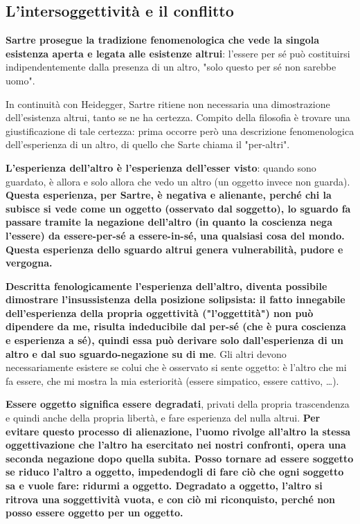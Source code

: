 \subsection{L'intersoggettività e il conflitto}

\textbf{Sartre prosegue la tradizione fenomenologica che vede la singola esistenza aperta e legata alle esistenze altrui}: l'essere per sé può costituirsi indipendentemente dalla presenza di un altro, "solo questo per sé non sarebbe uomo".

In continuità con Heidegger, Sartre ritiene non necessaria una dimostrazione dell'esistenza altrui, tanto se ne ha certezza.
Compito della filosofia è trovare una giustificazione di tale certezza: prima occorre però una descrizione fenomenologica dell'esperienza di un altro, di quello che Sarte chiama il "per-altri".

\textbf{L'esperienza dell'altro è l'esperienza dell'esser visto}: quando sono guardato, è allora e solo allora che vedo un altro (un oggetto invece non guarda). \textbf{Questa esperienza, per Sartre, è negativa e alienante, perché chi la subisce si vede come un oggetto (osservato dal soggetto), lo sguardo fa passare tramite la negazione dell'altro (in quanto la coscienza nega l'essere) da essere-per-sé a essere-in-sé, una qualsiasi cosa del mondo. Questa esperienza dello sguardo altrui genera vulnerabilità, pudore e vergogna.}

\textbf{Descritta fenologicamente l'esperienza dell'altro, diventa possibile dimostrare l'insussistenza della posizione solipsista: il fatto innegabile dell'esperienza della propria oggettività ("l'oggettità") non può dipendere da me, risulta indeducibile dal per-sé (che è pura coscienza e esperienza a sé), quindi essa può derivare solo dall'esperienza di un altro e dal suo sguardo-negazione su di me}. Gli altri devono necessariamente esistere se colui che è osservato si sente oggetto: è l'altro che mi fa essere, che mi mostra la mia esteriorità (essere simpatico, essere cattivo, \dots).

\textbf{Essere oggetto significa essere degradati}, privati della propria trascendenza e quindi anche della propria libertà, e fare esperienza del nulla altrui. \textbf{Per evitare questo processo di alienazione, l'uomo  rivolge all'altro la stessa oggettivazione che l'altro ha esercitato nei nostri confronti, opera una seconda negazione dopo quella subita. Posso tornare ad essere soggetto se riduco l'altro a oggetto, impedendogli di fare ciò che ogni soggetto sa e vuole fare: ridurmi a oggetto. Degradato a oggetto, l'altro si ritrova una soggettività vuota, e con ciò mi riconquisto, perché non posso essere oggetto per un oggetto.}

